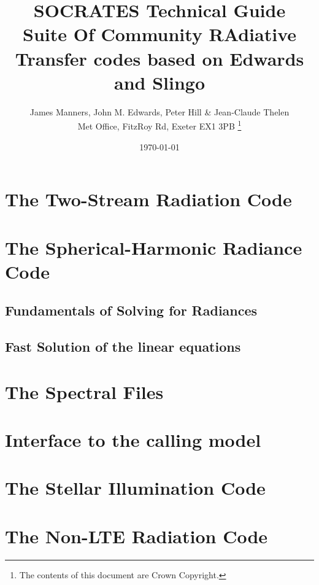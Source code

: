 \documentclass[11pt,a4paper,english,twoside,openright]{book}
\begin{document}

\pagestyle{empty}

\newcommand{\um}{$\mu$m}

\newcommand{\bx}{\mathbf{x}}
\newcommand{\bn}{\mathbf{n}}
\newcommand{\bnp}{\mathbf{n}'}

\title{SOCRATES Technical Guide\\
Suite Of Community RAdiative Transfer codes based on Edwards and Slingo}
\date{\today}

\author{James Manners, John M. Edwards, Peter Hill \& Jean-Claude Thelen\\
Met Office, FitzRoy Rd, Exeter EX1 3PB
\thanks{
 The contents of this document are Crown Copyright.
}}
\maketitle

\tableofcontents

\clearpage

\pagestyle{fancy}
\latex{
\fancyhf{}
\fancyhead[LE,RO]{\thepage}
\fancyhead[LO]{\nouppercase{\rightmark}}
\fancyhead[RE]{\nouppercase{\leftmark}}
}

\setlength{\headheight}{13.6pt}
\addtolength{\topmargin}{-1.6pt}

\chapter{The Two-Stream Radiation Code}
\label{sec:twostream}


\chapter{The Spherical-Harmonic Radiance Code}
\label{sec:radiance}
\section{Fundamentals of Solving for Radiances}

\section{Fast Solution of the linear equations}


\chapter{The Spectral Files}
\label{sec:spec}
 
 
 

\chapter{Interface to the calling model}
\label{sec:interface}


\chapter{The Stellar Illumination Code}


\chapter{The Non-LTE Radiation Code}
\label{sec:um_nlte_code_desc}




\end{document}
